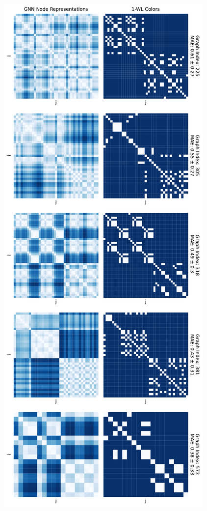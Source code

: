 \begin{figure}[!ht]
    \centering
    \begin{minipage}[b]{0.45992852703\textwidth}
        \centering
        \includegraphics[width=\textwidth, left]{Figures/heatmaps_ENZYMES_0.pdf}

\end{minipage}
\end{figure}
